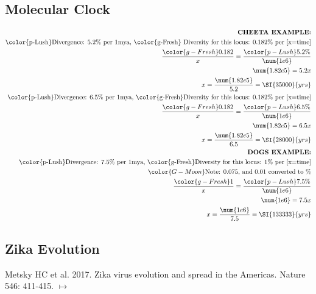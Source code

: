 \documentclass[12pt,a4paper]{article}
\begin{document}
\subsection{Molecular Clock}
\begin{align*}
    \textbf{CHEETA EXAMPLE:}\\
    \text{{\color{p-Lush}Divergence: 5.2\%} per 1mya, {\color{g-Fresh} Diversity for this locus: 0.182\%} per [x=time]}\\
    \frac{{\color{g-Fresh}0.182}}{x} = \frac{{\color{p-Lush}5.2\%}}{\num{1e6}}\\
    \num{1.82e5}= 5.2x\\
    x = \frac{\num{1.82e5}}{5.2} = \SI{35000}{yrs}\\ 
    \text{{\color{p-Lush}Divergence: 6.5\%} per 1mya, {\color{g-Fresh}Diversity for this locus: 0.182\%} per [x=time]}\\
    \frac{{\color{g-Fresh}0.182}}{x} = \frac{{\color{p-Lush}6.5\%}}{\num{1e6}}\\
    \num{1.82e5}= 6.5x\\
    x = \frac{\num{1.82e5}}{6.5} = \SI{28000}{yrs}\\ 
    \textbf{DOGS EXAMPLE:}\\
    \text{{\color{p-Lush}Divergence: 7.5\%} per 1mya, {\color{g-Fresh}Diversity for this locus: 1\%} per [x=time]}\\
    {\color{G-Moon}\text{Note: 0.075, and 0.01 converted to \%}}\\
    \frac{{\color{g-Fresh}1}}{x} = \frac{{\color{p-Lush}7.5\%}}{\num{1e6}}\\
    \num{1e6}= 7.5x\\
    x = \frac{\num{1e6}}{7.5} = \SI{133333}{yrs}\\
\end{align*}

\newpage
{}
\subsection{Zika Evolution}
{\color{darklc} Metsky HC et al. 2017. Zika virus evolution and spread in the Americas. Nature 546: 411-415. $\mapsto$}
\end{document}
